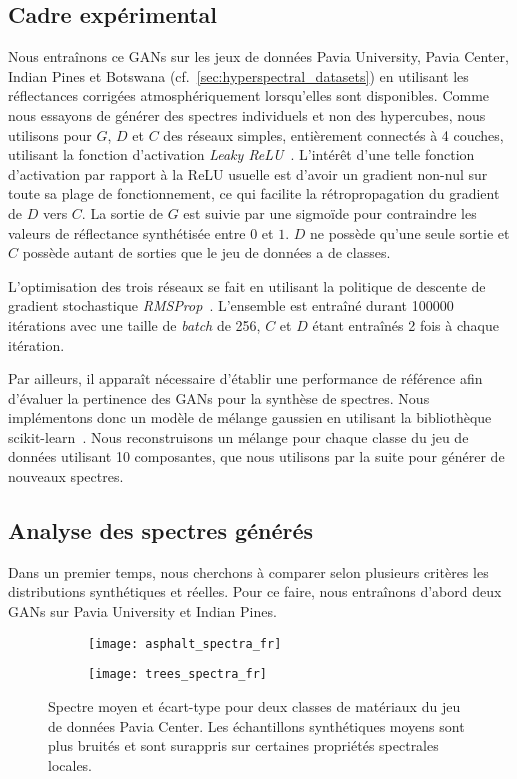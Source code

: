 \subsection{Cadre expérimental}
\label{sec:experimental_setup}

Nous entraînons ce \glspl{GAN} sur les jeux de données Pavia University, Pavia Center, Indian Pines et Botswana (cf.~\cref{sec:hyperspectral_datasets}) en utilisant les réflectances corrigées atmosphériquement lorsqu'elles sont disponibles. Comme nous essayons de générer des spectres individuels et non des hypercubes, nous utilisons pour $G$, $D$ et $C$ des réseaux simples, entièrement connectés à 4 couches, utilisant la fonction d'activation \emph{Leaky \gls{ReLU}}~\cite{maas_rectifier_2013}. L'intérêt d'une telle fonction d'activation par rapport à la \gls{ReLU} usuelle est d'avoir un gradient non-nul sur toute sa plage de fonctionnement, ce qui facilite la rétropropagation du gradient de $D$ vers $C$. La sortie de $G$ est suivie par une sigmoïde pour contraindre les valeurs de réflectance synthétisée entre $0$ et $1$. $D$ ne possède qu'une seule sortie et $C$ possède autant de sorties que le jeu de données a de classes.

L'optimisation des trois réseaux se fait en utilisant la politique de descente de gradient stochastique \emph{RMSProp}~\cite{tielman_lecture_2012}. L'ensemble est entraîné durant \num{100000} itérations avec une taille de \emph{batch} de 256, $C$ et $D$ étant entraînés 2 fois à chaque itération.

Par ailleurs, il apparaît nécessaire d'établir une performance de référence afin d'évaluer la pertinence des \glspl{GAN} pour la synthèse de spectres. Nous implémentons donc un modèle de mélange gaussien en utilisant la bibliothèque scikit-learn~\cite{pedregosa_scikit-learn_2011}. Nous reconstruisons un mélange pour chaque classe du jeu de données utilisant 10 composantes, que nous utilisons par la suite pour générer de nouveaux spectres.

\subsection{Analyse des spectres générés}
\label{sec:analysis}

Dans un premier temps, nous cherchons à comparer selon plusieurs critères les distributions synthétiques et réelles. Pour ce faire, nous entraînons d'abord deux \glspl{GAN} sur Pavia University et Indian Pines.

\begin{figure}
\begin{subfigure}{0.5\textwidth}
\texttt{[image: asphalt\_spectra\_fr]}
\end{subfigure}%
\begin{subfigure}{0.5\textwidth}
\texttt{[image: trees\_spectra\_fr]}
\end{subfigure}
\caption{Spectre moyen et écart-type pour deux classes de matériaux du jeu de données Pavia Center. Les échantillons synthétiques moyens sont plus bruités et sont surappris sur certaines propriétés spectrales locales.}
\label{fig:mean_spectra}
\end{figure}

